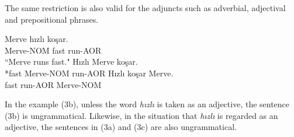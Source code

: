 \documentclass[11pt,a4paper]{article}
\begin{document}
The same restriction is also valid for the adjuncts such as adverbial, adjectival and prepositional phrases.
\begin{exe}
		\ex
			\begin{xlist}
				\ex Merve hızlı koşar.\\
				Merve-NOM fast run-AOR\\
				``Merve runs fast."
				\ex *Hızlı Merve koşar.\\
				*fast Merve-NOM run-AOR
				\ex Hızlı koşar Merve.\\
				fast run-AOR Merve-NOM
			\end{xlist}
	\end{exe}
In the example (3b), unless the word \emph{hızlı} is taken as an adjective, the sentence (3b) is ungrammatical. Likewise, in the situation that \emph{hızlı} is regarded as an adjective, the sentences in (3a) and (3c) are also ungrammatical.
\end{document}
